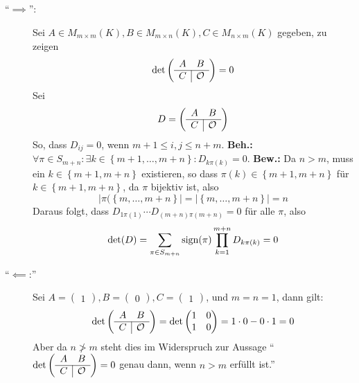 \documentclass[sectionformat = aufgabe]{gadsescript}
\begin{document}
\subsection{}
\begin{description}
	\item[``$ \implies  $'':] 
		Sei $ A \in M_{m \times m} (K), B \in M_{m \times n} (K), C \in M_{n \times m} (K) $ gegeben, zu zeigen
		\[
			\det
			\left(
			\begin{array}{c | c}
				A & B \\ \hline
				C & \mathcal{O} 
			\end{array}
			\right)
			= 0
		\]
		Sei
		\[
			D = \left( 
				\begin{array}{c | c}
					A & B \\ \hline
					C & \mathcal{O} 
				\end{array}
			\right) 
		\]
		So, dass $ D_{ij} = 0 $, wenn $ m + 1 \leq i,j \leq n + m $.
		\textbf{Beh.:} $ \forall \pi \in S_{m + n} : \exists k \in \left\{ m + 1, \dotsc, m + n \right\} : D_{k \pi (k)} = 0 $.
		\textbf{Bew.:} Da $ n > m $, muss ein $ k \in \left\{ m + 1, m + n \right\}  $ existieren, so dass $ \pi (k) \in \left\{ m + 1, m + n \right\}  $ für $ k \in \left\{ m + 1, m + n \right\}  $, da $ \pi  $ bijektiv ist, also
		\[
			\left| \pi (\left\{ m, \dotsc, m + n \right\}  \right| = \left| \left\{ m, \dotsc, m + n \right\}  \right| = n
		\]
		Daraus folgt, dass $ D_{1 \pi (1)} \dotsb D_{(m + n) \pi (m +n) } = 0 $ für alle $ \pi  $, also
		\[
			\det(D) = \sum_{\pi \in S_{m + n} }^{} \operatorname{sign} (\pi) \prod_{k=1}^{m + n} D_{k \pi (k)} = 0  
		\]
	\item[``$ \impliedby  $:'']
		Sei $ A = \begin{pmatrix} 1 \end{pmatrix} , B = \begin{pmatrix} 0 \end{pmatrix} , C = \begin{pmatrix} 1 \end{pmatrix}  $, und $ m = n = 1 $, dann gilt:
		\[
			\det\left( 
				\begin{array}{c | c}
					A & B \\ \hline
					C & \mathcal{O} 
				\end{array}
			\right) 
			= \det \begin{pmatrix} 1 & 0 \\ 1 & 0 \end{pmatrix} = 1 \cdot 0 - 0 \cdot 1 = 0
		\]
		Aber da $ n \ngtr m $ steht dies im Widerspruch zur Aussage ``$ \det \left( \begin{array}{c | c} A & B \\ \hline C & \mathcal{O} \end{array} \right) = 0 $ genau dann, wenn $ n > m $ erfüllt ist.''
\end{description}
\end{document}
